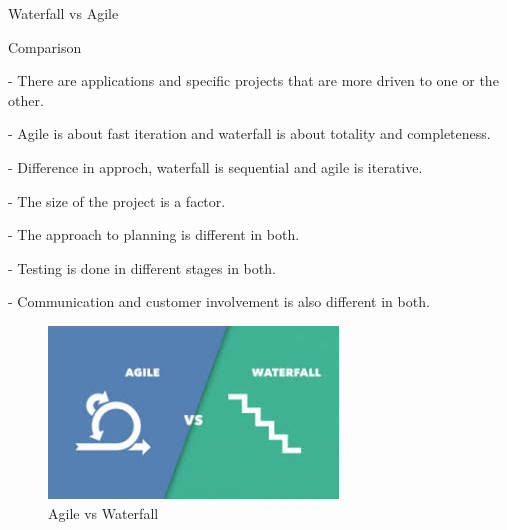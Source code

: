 \begin{frame}{Waterfall vs Agile}
    \begin{block}{Comparison}
    
        - There are applications and specific projects that are more driven to one or the other.

        - Agile is about fast iteration and waterfall is about totality and completeness.
    
        - Difference in approch, waterfall is sequential and agile is iterative.
    
        - The size of the project is a factor.
        
        - The approach to planning is different in both.

        - Testing is done in different stages in both.
    
        - Communication and customer involvement is also different in both.
    
    \end{block}

    \begin{figure}
        \centering
        \includegraphics[scale=0.2]{images/illustrate/agilevscascade.png}
        \caption{Agile vs Waterfall}
        \end{figure}

\end{frame}
